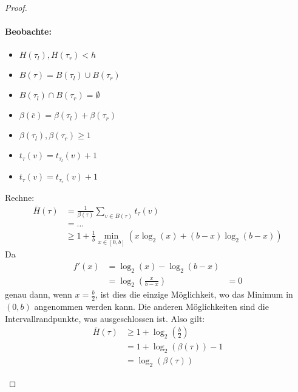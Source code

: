 \begin{proof}
\begin{itemize}[label=$\lozenge$, itemsep=2ex]
\paragraph{Beobachte:}
\begin{itemize}
	\item $H(\tau_l), H(\tau_r) <h$
	\item $B(\tau)= B(\tau_l) \cup B(\tau_r)$
	\item $B(\tau_l) \cap B(\tau_r) = \emptyset$
	\item $\beta(\overline{c})= \beta(\tau_l) + \beta(\tau_r)$
	\item $\beta(\tau_l), \beta(\tau_r) \ge 1$
	\item $t_{\tau}(v)= t_{\tau_l}(v)+1$
	\item $t_{\tau}(v)= t_{\tau_r}(v)+1$
\end{itemize}
Rechne:
\begin{align*}
\overline{H}(\tau) 
&= \frac{1}{\beta(\tau)}\sum_{v \in B(\tau)} t_{\tau}(v) \\
&= \ldots \\
&\ge 1+\frac{1}{b} \min_{x \in [0,b]} (x \log_2(x) + (b-x) \log_2(b-x))
\end{align*}
Da
\begin{align*}
f'(x)
&= \log_2(x) -\log_2(b-x) \\
&= \log_2(\frac{x}{b-x}) &=0
\end{align*}
genau dann, wenn $x=\frac{b}{2}$, ist dies die einzige Möglichkeit, wo das Minimum in $(0,b)$ angenommen werden kann. Die anderen Möglichkeiten sind die Intervallrandpunkte, was ausgeschlossen ist.
Also gilt:
\begin{align*}
	\overline{H}(\tau) 
	&\ge 1+ \log_2(\frac{b}{2}) \\
	&= 1+ \log_2(\beta(\tau)) -1 \\
	&= \log_2(\beta(\tau))
\end{align*}
\end{itemize}
\end{proof}

